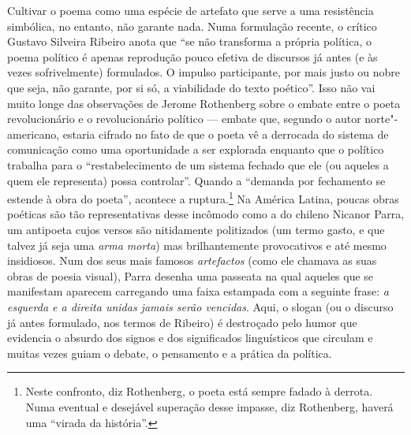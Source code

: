 Cultivar o poema como uma espécie de artefato que serve a uma
resistência simbólica, no entanto, não garante nada. Numa formulação
recente, o crítico Gustavo Silveira Ribeiro anota que ``se não
transforma a própria política, o poema político é apenas reprodução
pouco efetiva de discursos já antes (e às vezes sofrivelmente)
formulados. O impulso participante, por mais justo ou nobre que seja,
não garante, por si só, a viabilidade do texto poético''. Isso não vai
muito longe das observações de Jerome Rothenberg sobre o embate entre o
poeta revolucionário e o revolucionário político --- embate que, segundo o
autor norte"-americano, estaria cifrado no fato de que o poeta vê a
derrocada do sistema de comunicação como uma oportunidade a ser
explorada enquanto que o político trabalha para o ``restabelecimento de
um sistema fechado que ele (ou aqueles a quem ele representa) possa
controlar''. Quando a ``demanda por fechamento se estende à obra do
poeta'', acontece a ruptura.\footnote{Neste confronto, diz Rothenberg, o
  poeta está sempre fadado à derrota. Numa eventual e desejável
  superação desse impasse, diz Rothenberg, haverá uma ``virada da
  história''.} Na América Latina, poucas obras poéticas são tão
representativas desse incômodo como a do chileno Nicanor Parra, um
antipoeta cujos versos são nitidamente politizados (um termo gasto, e
que talvez já seja uma \emph{arma morta}) mas brilhantemente
provocativos e até mesmo insidiosos. Num dos seus mais famosos
\emph{artefactos} (como ele chamava as suas obras de poesia visual),
Parra desenha uma passeata na qual aqueles que se manifestam aparecem
carregando uma faixa estampada com a seguinte frase: \emph{a esquerda e
a direita unidas jamais serão vencidas}. Aqui, o slogan (ou o
discurso já antes formulado, nos termos de Ribeiro) é destroçado pelo
humor que evidencia o absurdo dos signos e dos significados linguísticos
que circulam e muitas vezes guiam o debate, o pensamento e a prática da
política.

\asterisc

